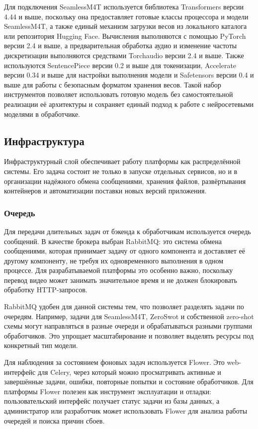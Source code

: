 \documentclass[a4paper,article,14pt]{extarticle}
\begin{document}
Для подключения SeamlessM4T используется библиотека Transformers версии 4.44 и выше, поскольку она предоставляет готовые классы процессора и модели SeamlessM4T, а также единый механизм загрузки весов из локального каталога или репозитория Hugging Face. Вычисления выполняются с помощью PyTorch версии 2.4 и выше, а предварительная обработка аудио и изменение частоты дискретизации выполняются средствами Torchaudio версии 2.4 и выше. Также используются SentencePiece версии 0.2 и выше для токенизации, Accelerate версии 0.34 и выше для настройки выполнения модели и Safetensors версии 0.4 и выше для работы с безопасным форматом хранения весов. Такой набор инструментов позволяет использовать готовую модель без самостоятельной реализации её архитектуры и сохраняет единый подход к работе с нейросетевыми моделями в обработчике.

\subsection{Инфраструктура}

Инфраструктурный слой обеспечивает работу платформы как распределённой системы. Его задача состоит не только в запуске отдельных сервисов, но и в организации надёжного обмена сообщениями, хранения файлов, развёртывания контейнеров и автоматизации поставки новых версий приложения.

\subsubsection{Очередь}

Для передачи длительных задач от бэкенда к обработчикам используется очередь сообщений. В качестве брокера выбран RabbitMQ: это система обмена сообщениями, которая принимает задачу от одного компонента и доставляет её другому компоненту, не требуя их одновременного выполнения в одном процессе. Для разрабатываемой платформы это особенно важно, поскольку перевод видео может занимать значительное время и не должен блокировать обработку HTTP-запросов.

RabbitMQ удобен для данной системы тем, что позволяет разделять задачи по очередям. Например, задачи для SeamlessM4T, ZeroSwot и собственной zero-shot схемы могут направляться в разные очереди и обрабатываться разными группами обработчиков. Это упрощает масштабирование и позволяет выделять ресурсы под конкретный тип модели.

Для наблюдения за состоянием фоновых задач используется Flower. Это web-интерфейс для Celery, через который можно просматривать активные и завершённые задачи, ошибки, повторные попытки и состояние обработчиков. Для платформы Flower полезен как инструмент эксплуатации и отладки: пользовательский интерфейс получает статус задачи из базы данных, а администратор или разработчик может использовать Flower для анализа работы очередей и поиска причин сбоев.
\end{document}
